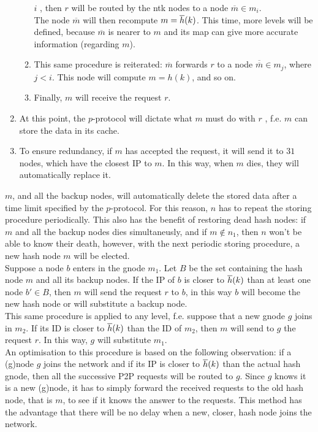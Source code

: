 \documentclass[a4paper]{article}
\def\ove#1{{\overline{#1}}}
\theoremstyle{definition}
\begin{document}
\begin{enumerate}
\begin{enumerate}
				$i$ , then $r$ will be routed by the
				ntk nodes to a node $\ove m\in m_i$.\\
				The node $\ove m$ will then recompute $m=\h(k)$.
				This time, more levels will be defined,
				because $\ove m$ is nearer to $m$ and its
				map can give more accurate information
				(regarding $m$).
			\item This same procedure is reiterated: $\ove m$
				forwards $r$ to a node $\ove {\ove m} \in m_j$,
				where $j<i$. This node will compute $m=h(k)$, and so
				on.
			\item Finally, $m$ will receive the request $r$.
		\end{enumerate}
	\item At this point, the $p$-protocol will dictate what $m$ must do
		with $r$ , f.e. $m$ can store the data in its cache.
	\item To ensure redundancy, if $m$ has accepted the request, it will
		send it to $31$ nodes, which have the closest IP to $m$. 
		In this way, when $m$ dies, they will automatically replace it.
\end{enumerate}
$m$, and all the backup nodes, will automatically delete the stored data
after a time limit specified by the $p$-protocol. For this reason, $n$ has to
repeat the storing procedure periodically. This also has the benefit of
restoring dead hash nodes: if $m$ and all the backup nodes dies simultaneusly,
and if $m\notin n_1$, then $n$ won't be able to know their death, however,
with the next periodic storing procedure, a new hash node $m$ will be elected.\\
\newline
Suppose a node $b$ enters in the gnode $m_1$. Let $B$ be the set containing
the hash node $m$ and all its backup nodes. If the IP of $b$ is closer to
$\h(k)$ than at least one node $b' \in B$, then $m$ will send the request $r$
to $b$, in this way $b$ will become the new hash node or will substitute a
backup node.\\
This same procedure is applied to any level, f.e. suppose that a new gnode $g$
joins in $m_2$. If its ID is closer to $\h(k)$ than the ID of $m_2$, then $m$
will send to $g$ the request $r$. In this way, $g$ will substitute $m_1$.\\
An optimisation to this procedure is based on the following observation: 
if a (g)node $g$ joins the network and if its IP is closer to $\h(k)$ than the
actual hash gnode, then all the successive P2P requests will be
routed to $g$. Since $g$ knows it is a new (g)node, it has to simply forward
the received requests to the old hash node, that is $m$, to see if it knows
the answer to the requests. This method has the advantage that there will be
no delay when a new, closer, hash node joins the network.
\end{document}
